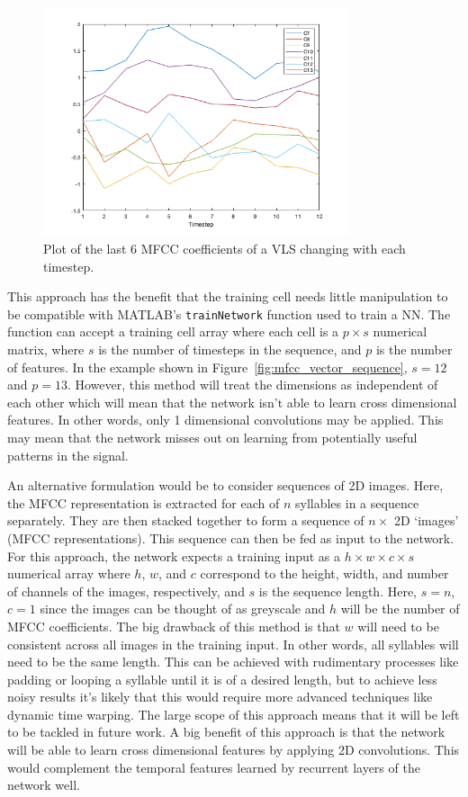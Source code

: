 \begin{figure}[ht]
  \centering
  \includegraphics[width=0.8\textwidth]{figures/mfcc_vector_sequence_2.png}
  \caption{Plot of the last 6 MFCC coefficients of a VLS changing with each
  timestep.}\label{fig:mfcc_vector_sequence_2}
\end{figure}

This approach has the benefit that the training cell needs little
manipulation to be compatible with MATLAB's \texttt{trainNetwork}
function used to train a NN\@. The function can accept a training cell array
where each cell is a $p \times s$ numerical matrix, where $s$ is the number
of timesteps in the sequence, and $p$ is the number of features. In the
example shown in Figure~\ref{fig:mfcc_vector_sequence}, $s=12$ and $p=13$.
However, this method will treat the dimensions as independent of each other
which will mean that the network isn't able to learn cross dimensional
features. In other words, only 1 dimensional convolutions may be applied.
This may mean that the network misses out on learning from potentially
useful patterns in the signal.

An alternative formulation would be to consider sequences of 2D images. Here,
the MFCC representation is extracted for each of $n$ syllables in a sequence
separately. They are then stacked together to form a sequence of $n \times$ 2D
`images' (MFCC representations). This sequence can then be fed as input to the
network. For this approach, the network expects a training input as a $h \times
w \times c \times s$ numerical array where $h$, $w$, and $c$ correspond to the
height, width, and number of channels of the images, respectively, and $s$ is
the sequence length. Here, $s=n$, $c=1$ since the images can be thought of as
greyscale and $h$ will be the number of MFCC coefficients. The big drawback of
this method is that $w$ will need to be consistent across all images in the
training input. In other words, all syllables will need to be the same length.
This can be achieved with rudimentary processes like padding or looping a
syllable until it is of a desired length, but to achieve less noisy results it's
likely that this would require more advanced techniques like dynamic time
warping. The large scope of this approach means that it will be left to be
tackled in future work. A big benefit of this approach is that the network will
be able to learn cross dimensional features by applying 2D convolutions. This
would complement the temporal features learned by recurrent layers of the
network well.


